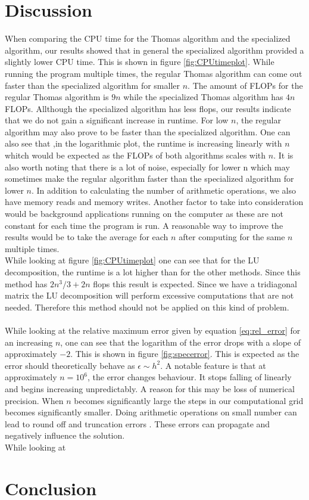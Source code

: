 \documentclass[twocolumn]{aastex62}
\begin{document}
\section{Discussion} \label{sec:discussion}
When comparing the CPU time for the Thomas algorithm and the specialized algorithm, our results showed that in general the specialized algorithm provided a slightly lower CPU time. This is shown in figure \ref{fig:CPUtimeplot}.  While running the program multiple times, the regular Thomas algorithm can come out faster than the specialized algorithm for smaller $n$.  The amount of FLOPs for the regular Thomas algorithm is $9n$ while the specialized Thomas algorithm has $4n$ FLOPs. Allthough the specialized algorithm has less flops, our results indicate that we do not gain a significant increase in runtime. For low $n$, the regular algorithm may also prove to be faster than the specialized algorithm. One can also see that ,in the logarithmic plot, the runtime is increasing linearly with $n$ whitch would be expected as the FLOPs of both algorithms scales with $n$.  It is also worth noting that there is a lot of noise, especially for lower n which may sometimes make the regular algorithm faster than the specialized algorithm for lower $n$. In addition to calculating the number of arithmetic operations, we also have memory reads and memory writes. Another factor to take into consideration would be background applications running on the computer as these are not constant for each time the program is run. A reasonable way to improve the results would be to take the average for each $n$ after computing for the same $n$ multiple times.\\\indent
While looking at figure \ref{fig:CPUtimeplot} one can see that for the LU decomposition, the runtime is a lot higher than for the other methods. Since this method has $2n^3/3+2n$ flops this result is expected. Since we have a tridiagonal matrix the LU decomposition will perform excessive computations that are not needed. Therefore this method should not be applied on this kind of problem.
\\\\\indent
While looking at the relative maximum error given by equation \ref{eq:rel_error} for an increasing $n$, one can see that the logarithm of the error drops with a slope of approximately $-2$. This is shown in figure \ref{fig:specerror}. This is expected as the error should theoretically behave as $\epsilon\sim h^2$.  A notable feature is that at approximately $n=10^6$, the error changes behaviour. It stops falling of linearly and begins increasing unpredictably. A reason for this may be loss of numerical precision. When $n$ becomes significantly large the steps in our computational grid becomes significantly smaller. Doing arithmetic operations on small number can lead to round off and truncation errors \citep[ch 4.2]{Morken:2017}. These errors can propagate and negatively influence the solution.\\\indent
While looking at 



\section{Conclusion} \label{sec:conclusion}



\end{document}
